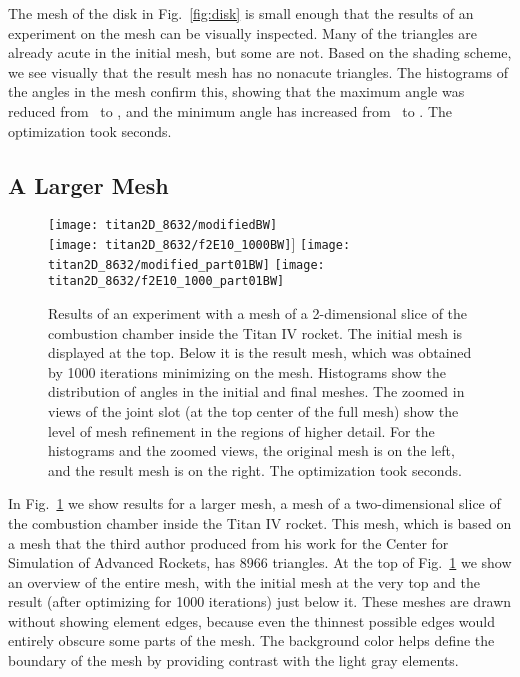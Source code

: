 \documentclass[final]{siamltex}
\begin{document}
The mesh of the disk in Fig.~\ref{fig:disk} is small enough that the
results of an experiment on the mesh can be visually inspected.  Many
of the triangles are already acute in the initial mesh, but some are
not.  Based on the shading scheme, we see visually that the result
mesh has no nonacute triangles.  The histograms of the angles in the
mesh confirm this, showing that the maximum angle was reduced from
\textdegree\ to \textdegree, and the minimum angle has
increased from \textdegree\ to \textdegree.  The
optimization took  seconds.


\subsection{A Larger Mesh}

\begin{figure}
  \centering
  \texttt{[image: titan2D\_8632/modifiedBW]}\\
  \texttt{[image: titan2D\_8632/f2E10\_1000BW]}\-106pt]
  \texttt{[image: titan2D\_8632/modified\_part01BW]}
  \hspace{7pt}\texttt{[image: titan2D\_8632/f2E10\_1000\_part01BW]}\caption{Results of an experiment with a mesh of a 2-dimensional
    slice of the combustion chamber inside the Titan IV rocket.  The
    initial mesh is displayed at the top.  Below it is the result
    mesh, which was obtained by 1000 iterations minimizing  on
    the mesh.  Histograms show the distribution of angles in the
    initial and final meshes.  The zoomed in views of the joint slot
    (at the top center of the full mesh) show the level of mesh
    refinement in the regions of higher detail.  For the histograms
    and the zoomed views, the original mesh is on the left, and the
    result mesh is on the right.  The optimization took 
    seconds.}
\label{fig:titan2D}
\end{figure}

In Fig.~\ref{fig:titan2D} we show results for a larger mesh, a
mesh of a two-dimensional slice of the combustion chamber inside the
Titan IV rocket.  This mesh, which is based on a mesh that the third
author produced from his work for the Center for Simulation of
Advanced Rockets, has 8966 triangles.  At the top of
Fig.~\ref{fig:titan2D} we show an overview of the entire mesh, with
the initial mesh at the very top and the result (after optimizing
 for 1000 iterations) just below it.  These meshes are drawn
without showing element edges, because even the thinnest possible
edges would entirely obscure some parts of the mesh.
The background color helps define the boundary of the mesh by
providing contrast with the light gray elements.
\end{document}
